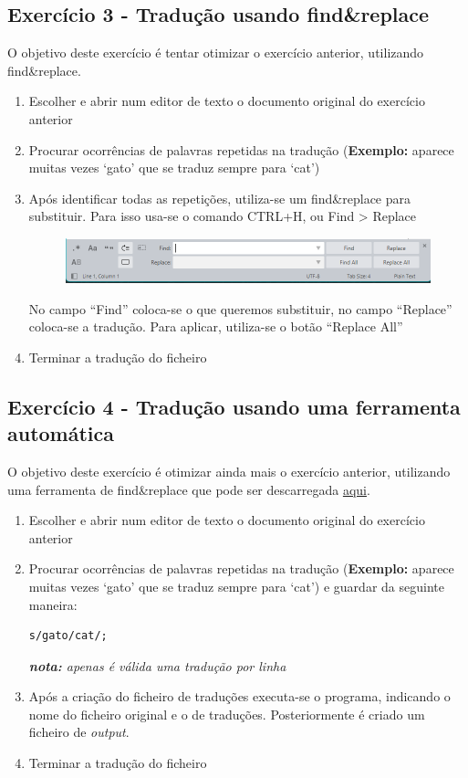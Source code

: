 \documentclass[10pt,a4paper,notitlepage]{article}
\begin{document}
\subsection*{Exercício 3 - Tradução usando find\&replace}
O objetivo deste exercício é tentar otimizar o exercício anterior, utilizando find\&replace.
\begin{enumerate}
    \item Escolher e abrir num editor de texto o documento original do exercício anterior
    \item Procurar ocorrências de palavras repetidas na tradução (\textbf{Exemplo:} aparece muitas vezes `gato' que se traduz sempre para `cat')
    \item Após identificar todas as repetições, utiliza-se um find\&replace para substituir. Para isso usa-se o comando CTRL+H, ou Find > Replace
    \begin{figure}[h!]
        \hspace{2em}
        \includegraphics[width=.7\textwidth]{findreplace.png}
        \label{fig:enter-label}
    \end{figure}
    
    No campo ``Find'' coloca-se o que queremos substituir, no campo ``Replace'' coloca-se a tradução. Para aplicar, utiliza-se o botão ``Replace All''
    \item Terminar a tradução do ficheiro    
\end{enumerate}

\newpage

\subsection*{Exercício 4 - Tradução usando uma ferramenta automática}
O objetivo deste exercício é otimizar ainda mais o exercício anterior, utilizando uma ferramenta de find\&replace que pode ser descarregada \href{https://jjoao.github.io/ftt2023/util/script.py}{aqui}.
\begin{enumerate}
    \item Escolher e abrir num editor de texto o documento original do exercício anterior
    \item Procurar ocorrências de palavras repetidas na tradução (\textbf{Exemplo:} aparece muitas vezes `gato' que se traduz sempre para `cat') e guardar da seguinte maneira: 
    \begin{verbatim}
s/gato/cat/;
    \end{verbatim}
    \textit{\textbf{nota:} apenas é válida uma tradução por linha}
    \item Após a criação do ficheiro de traduções executa-se o programa, indicando o nome do ficheiro original e o de traduções. Posteriormente é criado um ficheiro de \textit{output}.
    \item Terminar a tradução do ficheiro
\end{enumerate}
\end{document}
